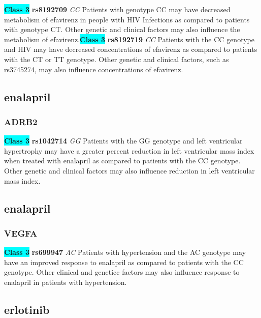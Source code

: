 \documentclass{book}
\begin{document}
\begin{center}
\textbf{\colorbox{cyan} {Class 3}} \textbf{ rs8192709 } \textit{ CC }
Patients with genotype CC may have decreased metabolism of efavirenz in people with HIV Infections as compared to patients with genotype CT. Other genetic and clinical factors may also influence the metabolism of efavirenz.\textbf{\colorbox{cyan} {Class 3}} \textbf{ rs8192719 } \textit{ CC }
Patients with the CC genotype and HIV may have decreased concentrations of efavirenz as compared to patients with the CT or TT genotype. Other genetic and clinical factors, such as rs3745274, may also influence concentrations of efavirenz. 


\end{center}\subsection{ enalapril }


\subsubsection{ ADRB2 }

\begin{center}
\textbf{\colorbox{cyan} {Class 3}} \textbf{ rs1042714 } \textit{ GG }
Patients with the GG genotype and left ventricular hypertrophy may have a greater percent reduction in left ventricular mass index when treated with enalapril as compared to patients with the CC genotype. Other genetic and clinical factors may also influence reduction in left ventricular mass index. 


\end{center}\subsection{ enalapril }


\subsubsection{ VEGFA }

\begin{center}
\textbf{\colorbox{cyan} {Class 3}} \textbf{ rs699947 } \textit{ AC }
Patients with hypertension and the AC genotype may have an improved response to enalapril as compared to patients with the CC genotype. Other clinical and geneticc factors may also influence response to enalapril in patients with hypertension. 


\end{center}\subsection{ erlotinib }
\end{document}
